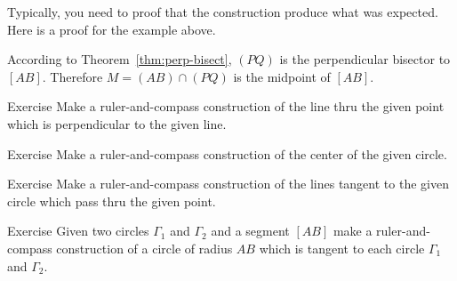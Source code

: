 \medskip

Typically, you need to proof that the construction produce what was expected. Here is a proof for the example above.

According to Theorem~\ref{thm:perp-bisect}, $(PQ)$ is the perpendicular bisector to $[AB]$.
Therefore $M=(AB)\cap(PQ)$ is the midpoint of $[AB]$. 
\qeds

\begin{thm}{Exercise}\label{ex:construction-perpendicular}
Make a ruler-and-compass construction of the line thru the given point which is perpendicular to the given line.
\end{thm}

\begin{thm}{Exercise}\label{ex:center}
Make a ruler-and-compass construction of the center 
of the given circle.
\end{thm}

\begin{thm}{Exercise}\label{ex:tangent}
Make a ruler-and-compass construction of the lines tangent to the given circle which pass thru the given point.
\end{thm}

\begin{thm}{Exercise}\label{ex:tangent-circle}
Given two circles $\Gamma_1$ and $\Gamma_2$ and a segment $[AB]$
make a ruler-and-compass construction of a circle of radius $AB$ 
which is tangent to each circle $\Gamma_1$ and $\Gamma_2$.
\end{thm}





